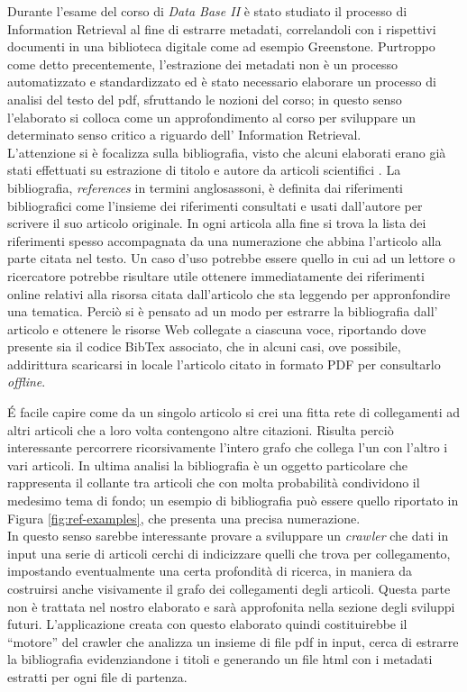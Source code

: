 Durante l'esame del corso di \textit{Data Base II} è stato studiato il processo di Information Retrieval al fine di estrarre metadati, correlandoli con i rispettivi documenti in una biblioteca digitale come ad esempio Greenstone. Purtroppo come detto precentemente, l'estrazione dei metadati non è un processo automatizzato e standardizzato ed è stato necessario elaborare un processo di analisi del testo del pdf, sfruttando le nozioni del corso; in questo senso l'elaborato si colloca come un approfondimento al corso per sviluppare un determinato senso critico a riguardo dell' Information Retrieval.\\
L'attenzione si è focalizza sulla bibliografia, visto che alcuni elaborati erano già stati effettuati su estrazione di titolo e autore da articoli scientifici \cite{Tarocchi}. La bibliografia, \textit{references} in  termini anglosassoni, è definita dai riferimenti bibliografici come l'insieme dei riferimenti consultati e usati dall'autore per scrivere il suo articolo originale. In ogni articola alla fine si trova la lista dei riferimenti spesso accompagnata da una numerazione che abbina l'articolo alla parte citata nel testo. Un caso d'uso potrebbe essere quello in cui ad un lettore o ricercatore potrebbe risultare utile ottenere immediatamente dei riferimenti online relativi alla risorsa citata dall'articolo che sta leggendo per appronfondire una tematica. Perciò si è pensato ad un modo per estrarre la bibliografia dall' articolo e ottenere le risorse Web collegate a ciascuna voce, riportando dove presente sia il codice BibTex associato, che in alcuni casi, ove possibile, addirittura scaricarsi in locale l'articolo citato in formato PDF per consultarlo \textit{offline}.

\'E facile capire come da un singolo articolo si crei una fitta rete di collegamenti ad altri articoli che a loro volta contengono altre citazioni. Risulta perciò interessante percorrere ricorsivamente l'intero grafo che collega l'un con l'altro i vari articoli. In ultima analisi la bibliografia è un oggetto particolare che rappresenta il collante tra articoli che con molta probabilità condividono il medesimo tema di fondo; un esempio di bibliografia può essere quello riportato in Figura \ref{fig:ref-examples}, che presenta una precisa numerazione.\\
In questo senso sarebbe interessante provare a sviluppare un \textit{crawler} che dati in input una serie di articoli cerchi di indicizzare quelli che trova per collegamento, impostando eventualmente una certa profondità di ricerca, in maniera da costruirsi anche visivamente il grafo dei collegamenti degli articoli. Questa parte non è trattata nel nostro elaborato e sarà approfonita nella sezione degli sviluppi futuri. L'applicazione creata con questo elaborato quindi costituirebbe il ``motore'' del crawler che analizza un insieme di file pdf in input, cerca di estrarre la bibliografia evidenziandone i titoli e generando un file html con i metadati estratti per ogni file di partenza. 



